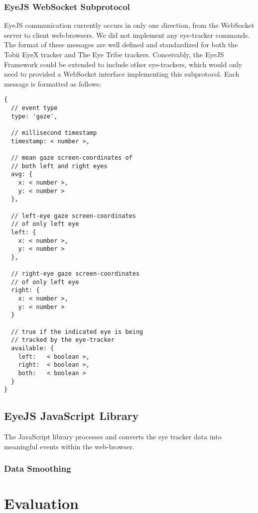 \documentclass{sigchi}
\begin{document}
\subsubsection{EyeJS WebSocket Subprotocol}
EyeJS communication currently occurs in only one direction, from
the WebSocket server to client web-browsers. We did not implement
any eye-tracker commands. The format of these messages are well
defined and standardized
for both the Tobii EyeX tracker and The Eye Tribe trackers. Conceivably,
the EyeJS Framework could be extended to include other eye-trackers,
which would only need to provided a WebSocket interface implementing
this subprotocol. Each message is formatted as follows:

\begin{lstlisting}
{
  // event type
  type: 'gaze',

  // millisecond timestamp
  timestamp: < number >,

  // mean gaze screen-coordinates of
  // both left and right eyes
  avg: {
    x: < number >,
    y: < number >
  },

  // left-eye gaze screen-coordinates
  // of only left eye
  left: {
    x: < number >,
    y: < number >
  },

  // right-eye gaze screen-coordinates
  // of only left eye
  right: {
    x: < number >,
    y: < number >
  }

  // true if the indicated eye is being
  // tracked by the eye-tracker
  available: {
    left:   < boolean >,
    right:  < boolean >,
    both:   < boolean >
  }
}
\end{lstlisting}


\subsection{EyeJS JavaScript Library}
The JavaScript library processes and converts the eye tracker data
into meaningful events within the web-browser.

\subsubsection{Data Smoothing}

\subsubsection{}



\section{Evaluation}
\end{document}
